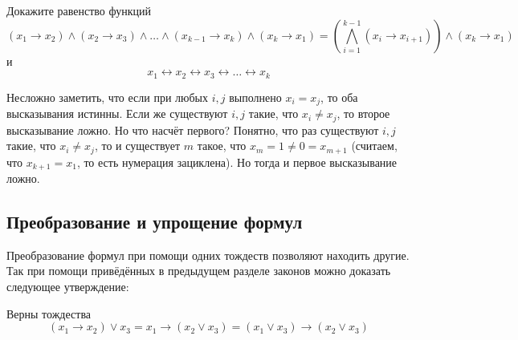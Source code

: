 \begin{Exercise}[counter=SecExercise, label={ex:boolean:chain}]
    \noindent
    Докажите равенство функций
    \[
        (x_1 \rightarrow x_2) \wedge (x_2 \rightarrow x_3) \wedge \ldots \wedge (x_{k-1} \rightarrow x_k) \wedge (x_k \rightarrow x_1) =
        \left( \bigwedge_{i=1}^{k-1} (x_i \rightarrow x_{i+1}) \right) \wedge (x_k \rightarrow x_1)
    \]
    и
    \[
        x_1 \leftrightarrow x_2 \leftrightarrow x_3 \leftrightarrow \ldots \leftrightarrow x_k
    \]
\end{Exercise}

\begin{Answer}
    \noindent
    Несложно заметить, что если при любых $ i, j $ выполнено $ x_i = x_j $, то оба высказывания истинны.
    Если же существуют $ i,j $ такие, что $ x_i \neq x_j $, то второе высказывание ложно.
    Но что насчёт первого?
    Понятно, что раз существуют $ i,j $ такие, что $ x_i \neq x_j $, то и существует $ m $ такое, что $ x_m = 1 \neq 0 = x_{m+1} $
    (считаем, что $ x_{k+1} = x_1 $, то есть нумерация зациклена).
    Но тогда и первое высказывание ложно.
\end{Answer}



\subsection{Преобразование и упрощение формул}
\label{subsec:boolean:transformation}



Преобразование формул при помощи одних тождеств позволяют находить другие.
Так при помощи привёдённых в предыдущем разделе законов можно доказать следующее утверждение:
\begin{statement}
    \label{statement:boolean:disjunction_implication}
    Верны тождества
    \[
        (x_1 \rightarrow x_2) \vee x_3 = x_1 \rightarrow (x_2 \vee x_3) = (x_1 \vee x_3) \rightarrow (x_2 \vee x_3)
    \]
\end{statement}


